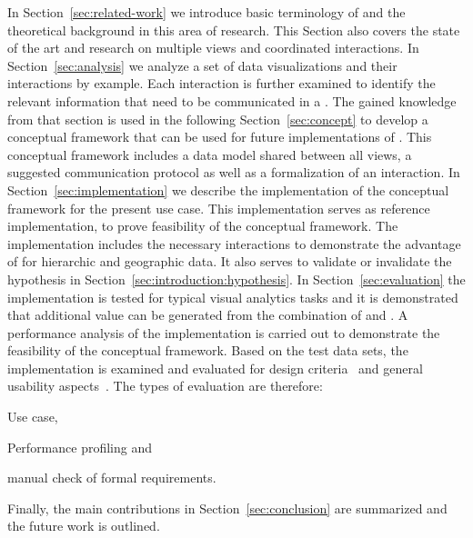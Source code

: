 In Section~\ref{sec:related-work} we introduce basic terminology of \cmvs{} and the theoretical background in this area of research.
This Section also covers the state of the art and research on multiple views and coordinated interactions.
In Section~\ref{sec:analysis} we analyze a set of data visualizations and their interactions by example.
Each interaction is further examined to identify the relevant information that need to be communicated in a \cmv{}.
The gained knowledge from that section is used in the following Section~\ref{sec:concept} to develop a conceptual framework that can be used for future implementations of \cmvs{}.
This conceptual framework includes a data model shared between all views, a suggested communication protocol as well as a formalization of an interaction.
In Section~\ref{sec:implementation} we describe the implementation of the conceptual framework for the present use case.
This implementation serves as reference implementation, to prove feasibility of the conceptual framework.
The implementation includes the necessary interactions to demonstrate the advantage of \cmvs{} for hierarchic and geographic data.
It also serves to validate or invalidate the hypothesis in Section~\ref{sec:introduction:hypothesis}.
In Section~\ref{sec:evaluation} the implementation is tested for typical visual analytics tasks and it is demonstrated that additional value can be generated from the combination of \tmap{} and \gv{}.
A performance analysis of the implementation is carried out to demonstrate the feasibility of the conceptual framework.
Based on the test data sets, the \cmv{} implementation is examined and evaluated for design criteria~\parencite{Baldonado2000} and general usability aspects~\parencite{Roberts2007}.
The types of evaluation are therefore:

\begin{enumerate*}[label=(\arabic*)]
  \item Use case,
  \item Performance profiling and
  \item manual check of formal requirements.
\end{enumerate*}

Finally, the main contributions in Section~\ref{sec:conclusion} are summarized and the future work is outlined.


